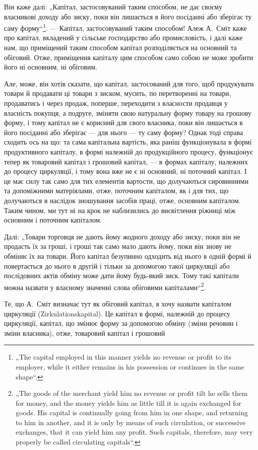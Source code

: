 
Він каже далі: „Капітал, застосовуваний таким способом, не дає своєму
власникові доходу або зиску, поки він лишається в його посіданні або
зберігає ту саму форму“\footnote*{
„The capital employed in this manner yields no revenue or profit to its employer,
while it either remains in his possession or continues in the same shape“.
}. — Капітал, застосовуваний таким способом!
Алеж А.~Сміт каже про капітал, вкладений у сільське господарство або
промисловість, і далі каже нам, що приміщений таким способом капітал
розподіляється на основний та обіговий. Отже, приміщення капіталу цим
способом само собою не може зробити його ні основним, ні обіговим.

Але, може, він хотів сказати, що капітал, застосований для того, щоб
продукувати товари й продавати ці товари з зиском, мусить, по перетворенні
на товари, продаватись і через продаж, поперше, переходити з
власности продавця у власність покупця, а подруге, зміняти свою натуральну
форму товару на грошову форму, і тому капітал не є корисний
для свого власника, поки він лишається в його посіданні або зберігає —
для нього — ту саму форму? Однак тоді справа сходить ось на що: та
сама капітальна вартість, яка раніш функціонувала в формі продуктивного
капіталу, в формі належній до продукційного процесу, функціонує
тепер як товаровий капітал і грошовий капітал, — в формах капіталу, належних
до процесу циркуляції, і тому вона вже не є ні основний, ні поточний
капітал. І це має силу так само для тих елементів вартости, що
долучаються сировинними та допоміжними матеріялами, отже, поточним
капіталом, як і для тих, що долучаються в наслідок зношування засобів
праці, отже, основним капіталом. Таким чином, ми тут ні на крок не
наблизились до висвітлення ріжниці між основним і поточним капіталом.

Далі: „Товари торговця не дають йому жодного доходу або зиску,
поки він не продасть їх за гроші, і гроші так само мало дають йому,
поки він знову не обміняє їх на товари. Його капітал безупинно одходить
від нього в одній формі й повертається до нього в другій і тільки
за допомогою такої циркуляції або послідовних актів обміну може дати
йому будь-який зиск. Тому такі капітали можна назвати у власному значенні
слова обіговими капіталами“\footnote*{
„The goods of the merchant yield him no revenue or profit tilt he sells them
for money, and the money yields him as little till it is again exchanged for goods.
His capital is continually going from him in one shape, and returning to him in
another, and it is only by means of such circulation, or successive exchanges, that
it can yield him any profit. Such capitals, therefore, may very properly be called
circulating capitals“.
}.

Те, що А.~Сміт визначає тут як обіговий капітал, я хочу назвати
капіталом циркуляції (Zirkulationskapital). Це капітал в формі,
належній до процесу циркуляції, капітал, що змінює форму за допомогою
обміну (зміни речовин і зміни власника), отже, товаровий капітал і грошовий
\parbreak{}  %
